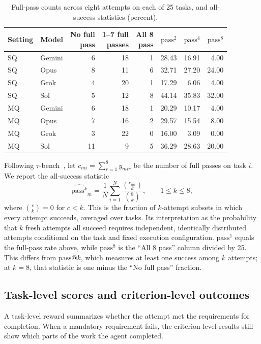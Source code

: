 \documentclass[11pt,letterpaper]{article}
\begin{document}
\begin{table}[H]\centering\small
\caption{Full-pass counts across eight attempts on each of 25 tasks, and all-success statistics (percent).}\label{tab:reliability}
\begin{tabular}{@{}llrrrrrr@{}}\toprule
Setting & Model & \shortstack{No full\\pass} & \shortstack{1--7 full\\passes} & \shortstack{All 8\\pass} & $\mathrm{pass}^{2}$ & $\mathrm{pass}^{4}$ & $\mathrm{pass}^{8}$\\\midrule
SQ & Gemini & 6 & 18 & 1 & 28.43 & 16.91 & 4.00\\
SQ & Opus & 8 & 11 & 6 & 32.71 & 27.20 & 24.00\\
SQ & Grok & 4 & 20 & 1 & 17.29 & 6.06 & 4.00\\
SQ & Sol & 5 & 12 & 8 & 44.14 & 35.83 & 32.00\\
\midrule
MQ & Gemini & 6 & 18 & 1 & 20.29 & 10.17 & 4.00\\
MQ & Opus & 7 & 16 & 2 & 29.57 & 15.54 & 8.00\\
MQ & Grok & 3 & 22 & 0 & 16.00 & 3.09 & 0.00\\
MQ & Sol & 11 & 9 & 5 & 36.29 & 28.63 & 20.00\\
\bottomrule\end{tabular}\end{table}

Following \(\tau\)-bench~\cite{taubench}, let $c_{mi}=\sum_{r=1}^{8}y_{mir}$ be the number of full passes on task $i$. We report the all-success statistic
\begin{equation}
\widehat{\mathrm{pass}^{k}}_m=\frac{1}{N}\sum_{i=1}^{N}\frac{\binom{c_{mi}}{k}}{\binom{8}{k}},\qquad 1\leq k\leq8,
\end{equation}
where $\binom{c}{k}=0$ for $c<k$. This is the fraction of $k$-attempt subsets in which every attempt succeeds, averaged over tasks. Its interpretation as the probability that $k$ fresh attempts all succeed requires independent, identically distributed attempts conditional on the task and fixed execution configuration. $\mathrm{pass}^{1}$ equals the full-pass rate above, while $\mathrm{pass}^{8}$ is the ``All 8 pass'' column divided by 25. This differs from $\mathrm{pass}@k$, which measures at least one success among $k$ attempts; at $k=8$, that statistic is one minus the ``No full pass'' fraction.

\subsection{Task-level scores and criterion-level outcomes}
A task-level reward summarizes whether the attempt met the requirements for completion. When a mandatory requirement fails, the criterion-level results still show which parts of the work the agent completed.
\end{document}
